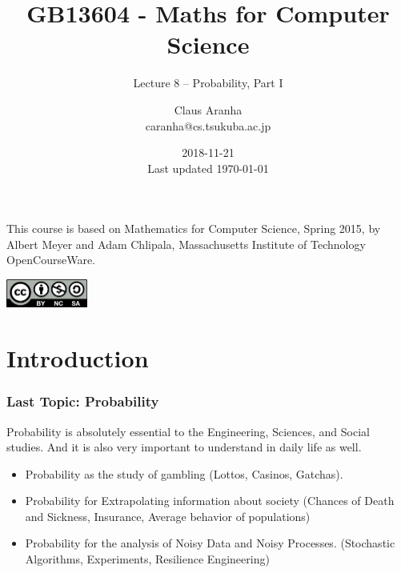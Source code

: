 \documentclass{beamer}
\title[GB13604]{GB13604 - Maths for Computer Science}
\subtitle[]{Lecture 8 -- Probability, Part I}
\author[Claus Aranha]{Claus Aranha\\{\footnotesize caranha@cs.tsukuba.ac.jp}}
\institute[COINS]{College of Information Science}
\date[2018-11-21]{2018-11-21\\{\tiny Last updated \today}}
\begin{document}
\begin{frame}
  \maketitle

  \begin{center}
    {\smaller This course is based on Mathematics for Computer Science, Spring
    2015, by Albert Meyer and Adam Chlipala, Massachusetts Institute
    of Technology OpenCourseWare.}
    
    \includegraphics[width=0.2\textwidth]{../img/by-nc-sa}
  \end{center}
\end{frame}

\section{Introduction}

\begin{frame}
  \frametitle{Last Topic: Probability}

  {\larger

    Probability is absolutely essential to the Engineering, Sciences,
    and Social studies. And it is also very important to understand in
    daily life as well.

    \bigskip

    \begin{itemize}
    \item Probability as the study of gambling (Lottos, Casinos,
      Gatchas).
      \bigskip
      
    \item Probability for Extrapolating information about society
      (Chances of Death and Sickness, Insurance, Average behavior of
      populations)
      \bigskip
      
    \item Probability for the analysis of Noisy Data and Noisy Processes.
      (Stochastic Algorithms, Experiments, Resilience Engineering)
    \end{itemize}
  }
\end{frame}
\end{document}
